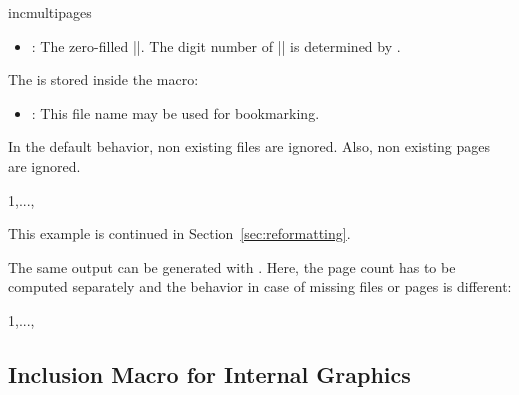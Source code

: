 \documentclass[a4paper,11pt]{ltxdoc}
\begin{document}
\begin{docCommand}[doc new=2026-02-25]{incmultipages}{}
\begin{itemize}
  \item{}: The zero-filled |\n|. The digit
    number of |\nn| is determined by .
  \end{itemize}
  The  is stored inside the macro:
  \begin{itemize}
  \item{}: This file name may be used for bookmarking.
  \end{itemize}
  In the default behavior, non existing files are ignored. Also, non
  existing pages are ignored.
\begin{dispListing}
{1,...,\last}
\end{dispListing}
This example is continued in Section~\ref{sec:reformatting}.\par
The same output can be generated with . Here, the page
count has to be computed separately and the behavior in case of missing files
or pages is different:
\begin{dispListing}
{1,...,\igrLastPage}
\end{dispListing}


\end{docCommand}


\clearpage
\subsection{Inclusion Macro for Internal Graphics}
\end{document}
